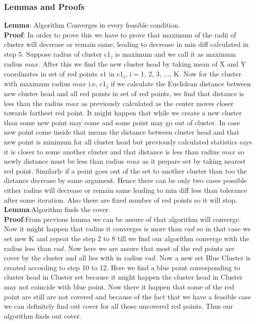 \documentclass[12pt,a4wide]{report}
\theoremstyle{plain}
\theoremstyle{definition}
\theoremstyle{remark}
\begin{document}
   \subsubsection{Lemmas and Proofs}
\textbf{Lemma}: Algorithm Converges in every feasible condition.\\
\textbf{Proof}: In order to prove this we have to prove that maximum of the radii of cluster will decrease or 
remain same, leading to decrease in min diff calculated in step 5. Suppose radius of cluster c1$_{j}$ is maximum and 
we call it as maximum radius $max$. After this we find the new
cluster head by taking mean of X and Y coordinates in set of red points $s1$ in c1$_{i}$, i$=$1, 2, 3, ..., K. Now for the 
cluster with maximum radius $max$ i.e, c1$_{j}$ if we calculate the Euclidean distance between new cluster head and 
all red points in set of red points, we find that distance is less than
the radius $max$ as previously calculated as the center moves closer towards farthest red point. It might happen that 
while we create a new cluster than some new point may come and some point may go out of cluster. In case new point 
come inside that means the distance between 
cluster head and that new point is minimum for all cluster head but previously calculated statistics says it is closer
to some another cluster and that distance is less than radius $max$ so newly 
distance must be less than radius $max$ as it prepare set by 
taking nearest red point. Similarly if a point goes out of the set to another cluster than too the 
distance decrease by same argument. Hence there can be only two cases possible either radius will decrease or
remain same leading to min diff less than tolerance after some iteration. Also 
there are fixed number of red points so it will stop.\\
\textbf{Lemma}:Algorithm finds the cover.\\
\textbf{Proof}:From previous lemma we can be assure of that algorithm will converge. Now it might happen that radius it converges is
more than $rad$ so in that case we set new K and repeat the step 2 to 8 till we find our algorithm converge with the radius less
than $rad$. Now here we are assure that most of the red points are cover by the cluster and all lies with in radius $rad$. Now 
a new set Blue Cluster is created according to step 10 to 12. Here we find a blue point corresponding to cluster head in 
Cluster set because it might happen the cluster head in Cluster may not coincide with blue point. Now there it happen that some 
of the red point are still are not covered and because of the fact that we have a feasible case we can definitely find out
cover for all those uncovered red points. Thus our algorithm finds out cover.\\
\end{document}
